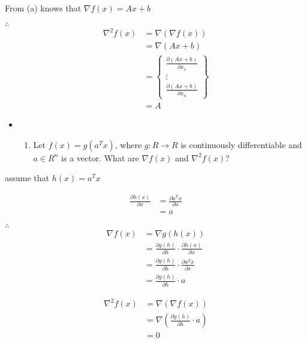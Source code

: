 \documentclass[11pt]{article}
\providecommand{\tightlist}{%
      \setlength{\itemsep}{0pt}\setlength{\parskip}{0pt}}
\begin{document}
    From (a) knows that \(\nabla f(x) = Ax+b\)

\(\therefore\) \[\begin{aligned}
    \nabla^2f(x) &= \nabla(\nabla f(x)) \\
        &= \nabla(Ax+b) \\
        &= \left\{\begin{matrix}
            \frac{\partial (Ax+b)}{\partial x_1} \\
            \vdots \\
            \frac{\partial (Ax+b)}{\partial x_n}
        \end{matrix}\right\} \\
        &= A
\end{aligned}\]

    \begin{itemize}
\item
  \begin{enumerate}
  \def\labelenumi{\alph{enumi})}
  \setcounter{enumi}{3}
  \tightlist
  \item
    Let \(f(x) = g(a^Tx)\), where \(g:R\to R\) is continuously
    differentiable and \(a\in R^n\) is a vector. What are
    \(\nabla f(x)\) and \(\nabla^2f(x)\)?
  \end{enumerate}
\end{itemize}

    assume that \(h(x) = a^Tx\)

\[\begin{aligned}
\frac{\partial h(x)}{\partial x} &= \frac{\partial a^Tx}{\partial x} \\
        &= a
\end{aligned}\]

\(\therefore\) \[\begin{aligned}
    \nabla f(x) &= \nabla g(h(x)) \\
        &= \frac{\partial g(h)}{\partial h} \cdot \frac{\partial h(x)}{\partial x} \\
        &= \frac{\partial g(h)}{\partial h} \cdot \frac{\partial a^Tx}{\partial x} \\
        &= \frac{\partial g(h)}{\partial h} \cdot a
\end{aligned}\]

\[\begin{aligned}
    \nabla^2 f(x) &= \nabla(\nabla f(x)) \\
        &= \nabla (\frac{\partial g(h)}{\partial h} \cdot a) \\
        &= 0
\end{aligned}\]
\end{document}
